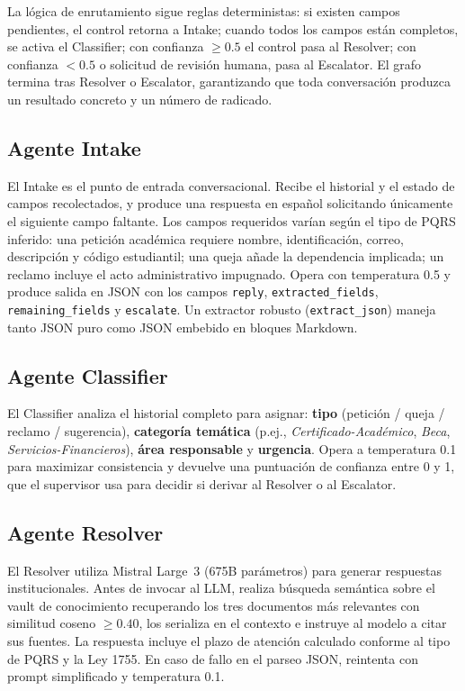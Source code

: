 \documentclass[runningheads]{llncs}
\begin{document}
La lógica de enrutamiento sigue reglas deterministas: si existen campos pendientes, el control retorna a Intake; cuando todos los campos están completos, se activa el Classifier; con confianza $\geq 0.5$ el control pasa al Resolver; con confianza $< 0.5$ o solicitud de revisión humana, pasa al Escalator. El grafo termina tras Resolver o Escalator, garantizando que toda conversación produzca un resultado concreto y un número de radicado.

\subsection{Agente Intake}

El Intake es el punto de entrada conversacional. Recibe el historial y el estado de campos recolectados, y produce una respuesta en español solicitando únicamente el siguiente campo faltante. Los campos requeridos varían según el tipo de PQRS inferido: una petición académica requiere nombre, identificación, correo, descripción y código estudiantil; una queja añade la dependencia implicada; un reclamo incluye el acto administrativo impugnado. Opera con temperatura 0.5 y produce salida en JSON con los campos \texttt{reply}, \texttt{extracted\_fields}, \texttt{remaining\_fields} y \texttt{escalate}. Un extractor robusto (\texttt{extract\_json}) maneja tanto JSON puro como JSON embebido en bloques Markdown.

\subsection{Agente Classifier}

El Classifier analiza el historial completo para asignar: \textbf{tipo} (petición / queja / reclamo / sugerencia), \textbf{categoría temática} (p.ej., \textit{Certificado-Académico}, \textit{Beca}, \textit{Servicios-Financieros}), \textbf{área responsable} y \textbf{urgencia}. Opera a temperatura 0.1 para maximizar consistencia y devuelve una puntuación de confianza entre 0 y 1, que el supervisor usa para decidir si derivar al Resolver o al Escalator.

\subsection{Agente Resolver}

El Resolver utiliza Mistral Large~3 (675B parámetros) para generar respuestas institucionales. Antes de invocar al LLM, realiza búsqueda semántica sobre el vault de conocimiento recuperando los tres documentos más relevantes con similitud coseno $\geq 0.40$, los serializa en el contexto e instruye al modelo a citar sus fuentes. La respuesta incluye el plazo de atención calculado conforme al tipo de PQRS y la Ley 1755. En caso de fallo en el parseo JSON, reintenta con prompt simplificado y temperatura 0.1.
\end{document}

